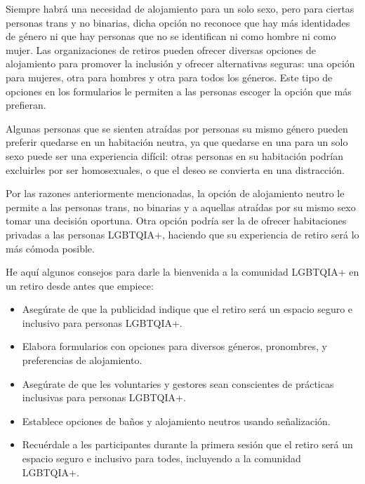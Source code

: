 \documentclass[12pt,openany]{book}
\begin{document}
Siempre habrá una necesidad de alojamiento para un solo sexo, pero para ciertas personas trans y no binarias, dicha opción no reconoce que hay más identidades de género ni que hay personas que no se identifican ni como hombre ni como mujer. Las organizaciones de retiros pueden ofrecer diversas opciones de alojamiento para promover la inclusión y ofrecer alternativas seguras: una opción para mujeres, otra para hombres y otra para todos los géneros. Este tipo de opciones en los formularios le permiten a las personas escoger la opción que más prefieran.

Algunas personas que se sienten atraídas por personas su mismo género pueden preferir quedarse en un habitación neutra, ya que quedarse en una para un solo sexo puede ser una experiencia difícil: otras personas en su habitación podrían excluirles por ser homosexuales, o que el deseo se convierta en una distracción.

Por las razones anteriormente mencionadas, la opción de alojamiento neutro le permite a las personas trans, no binarias y a aquellas atraídas por su mismo sexo tomar una decisión oportuna. Otra opción podría ser la de ofrecer habitaciones privadas a las personas LGBTQIA+, haciendo que su experiencia de retiro será lo más cómoda posible.

He aquí algunos consejos para darle la bienvenida a la comunidad LGBTQIA+ en un retiro desde antes que empiece:

\begin{itemize}
  \setlength\itemsep{-0.3em}
  \item Asegúrate de que la publicidad indique que el retiro será un espacio seguro e inclusivo para personas LGBTQIA+.
  \item Elabora formularios con opciones para diversos géneros, pronombres, y preferencias de alojamiento.
  \item Asegúrate de que les voluntaries y gestores sean conscientes de prácticas inclusivas para personas LGBTQIA+.
  \item Establece opciones de baños y alojamiento neutros usando señalización.
  \item Recuérdale a les participantes durante la primera sesión que el retiro será un espacio seguro e inclusivo para todes, incluyendo a la comunidad LGBTQIA+.
\end{itemize}

\begin{figure}[h]
    \centering
\end{figure}
\end{document}
